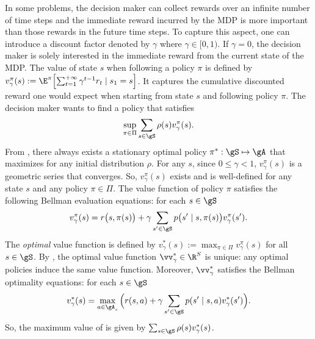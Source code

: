 In some problems, the decision maker can collect rewards over an infinite number of time steps and the immediate reward incurred by the MDP is more important than those rewards in the future time steps.
To capture this aspect, one can introduce a discount factor denoted by $\gamma$ where $\gamma\in[0,1)$.
If $\gamma=0$, the decision maker is solely interested in the immediate reward from the current state of the MDP.
The value of state $s$ when following a policy $\pi$ is defined by $v^\pi_{\gamma}(s):=\E^\pi\Bigl[\sum_{t=1}^{+\infty} \gamma^{t-1}r_t \mid s_1=s\Bigr]$.
It captures the cumulative discounted reward one would expect when starting from state $s$ and following policy $\pi$.
The decision maker wants to find a policy that satisfies
\begin{equation}
    \label{eq:discount_obj}
    \sup_{\pi\in\Pi}\sum_{s\in\gS}\rho(s)v^\pi_{\gamma}(s).
\end{equation}
From \cite[Chapter~6]{puterman2014markov}, there always exists a stationary optimal policy $\pi^*:\gS\mapsto\gA$ that maximizes  for any initial distribution $\rho$.
For any $s$, since $0\le\gamma<1$, $v_\gamma^\pi(s)$ is a geometric series that converges.
So, $v^\pi_\gamma(s)$ exists and is well-defined for any state $s$ and any policy $\pi\in\Pi$.
The value function of policy $\pi$ satisfies the following Bellman evaluation equations: for each $s\in\gS$
\begin{equation}
    \label{eq:discount_be_eval}
    v^\pi_\gamma(s) =r\bigl(s,\pi(s)\bigr) +\gamma\sum_{s'\in\gS}p\bigl(s'\mid s,\pi(s)\bigr)v^\pi_\gamma(s').
\end{equation}
The \emph{optimal} value function is defined by $v^*_\gamma(s):=\max_{\pi\in\Pi}v^\pi_\gamma(s)$ for all $s\in\gS$.
By \cite[Theorem~6.2.5]{puterman2014markov}, the optimal value function $\vv^*_\gamma\in\R^{S}$ is unique: any optimal policies induce the same value function.
Moreover, $\vv^*_\gamma$ satisfies the Bellman optimality equations: for each $s\in\gS$
\begin{equation}
    \label{eq:discount_be_opt}
     v^*_\gamma(s)= \max_{a\in\gA_s}\Big(r(s, a) +\gamma\sum_{s'\in\gS}p(s'\mid s,a)v^*_\gamma(s')\Big).
\end{equation}
So, the maximum value of  is given by $\sum_{s\in\gS}\rho(s)v^*_\gamma(s)$.

